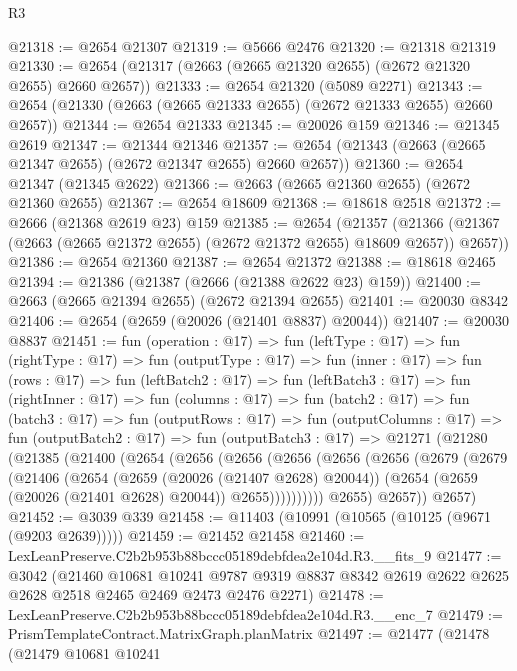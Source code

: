\begin{lexlean}{R3}
\begin{coremodule}
@21318 := @2654 @21307
@21319 := @5666 @2476
@21320 := @21318 @21319
@21330 := @2654 (@21317 (@2663 (@2665 @21320 @2655) (@2672 @21320 @2655) @2660 @2657))
@21333 := @2654 @21320 (@5089 @2271)
@21343 := @2654 (@21330 (@2663 (@2665 @21333 @2655) (@2672 @21333 @2655) @2660 @2657))
@21344 := @2654 @21333
@21345 := @20026 @159
@21346 := @21345 @2619
@21347 := @21344 @21346
@21357 := @2654 (@21343 (@2663 (@2665 @21347 @2655) (@2672 @21347 @2655) @2660 @2657))
@21360 := @2654 @21347 (@21345 @2622)
@21366 := @2663 (@2665 @21360 @2655) (@2672 @21360 @2655)
@21367 := @2654 @18609
@21368 := @18618 @2518
@21372 := @2666 (@21368 @2619 @23) @159
@21385 := @2654
    (@21357 (@21366 (@21367 (@2663 (@2665 @21372 @2655) (@2672 @21372 @2655) @18609 @2657)) @2657))
@21386 := @2654 @21360
@21387 := @2654 @21372
@21388 := @18618 @2465
@21394 := @21386 (@21387 (@2666 (@21388 @2622 @23) @159))
@21400 := @2663 (@2665 @21394 @2655) (@2672 @21394 @2655)
@21401 := @20030 @8342
@21406 := @2654 (@2659 (@20026 (@21401 @8837) @20044))
@21407 := @20030 @8837
@21451 := fun (operation : @17) =>
  fun (leftType : @17) =>
  fun (rightType : @17) =>
  fun (outputType : @17) =>
  fun (inner : @17) =>
  fun (rows : @17) =>
  fun (leftBatch2 : @17) =>
  fun (leftBatch3 : @17) =>
  fun (rightInner : @17) =>
  fun (columns : @17) =>
  fun (batch2 : @17) =>
  fun (batch3 : @17) =>
  fun (outputRows : @17) =>
  fun (outputColumns : @17) =>
  fun (outputBatch2 : @17) =>
  fun (outputBatch3 : @17) =>
  @21271
    (@21280
      (@21385
        (@21400
          (@2654
            (@2656
              (@2656
                (@2656
                  (@2656
                    (@2656
                      (@2679
                        (@2679
                          (@21406
                            (@2654
                              (@2659 (@20026 (@21407 @2628) @20044))
                              (@2654 (@2659 (@20026 (@21401 @2628) @20044)) @2655))))))))))
            @2655)
          @2657))
      @2657)
@21452 := @3039 @339
@21458 := @11403 (@10991 (@10565 (@10125 (@9671 (@9203 @2639)))))
@21459 := @21452 @21458
@21460 := LexLeanPreserve.C2b2b953b88bccc05189debfdea2e104d.R3.__fits_9
@21477 := @3042
    (@21460
      @10681
      @10241
      @9787
      @9319
      @8837
      @8342
      @2619
      @2622
      @2625
      @2628
      @2518
      @2465
      @2469
      @2473
      @2476
      @2271)
@21478 := LexLeanPreserve.C2b2b953b88bccc05189debfdea2e104d.R3.__enc_7
@21479 := PrismTemplateContract.MatrixGraph.planMatrix
@21497 := @21477
    (@21478
      (@21479
        @10681
        @10241

\end{coremodule}
\end{lexlean}
